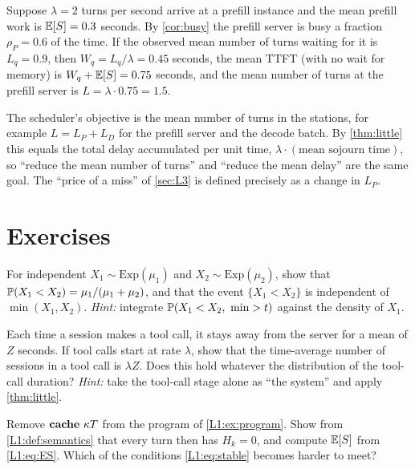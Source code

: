 \begin{example}\label{L1:ex:little}
Suppose $\lambda=2$ turns per second arrive at a prefill instance and the mean prefill
work is $\mathbb{E}[S]=0.3$ seconds. By \cref{cor:busy} the prefill server is busy a fraction
$\rho_P=0.6$ of the time. If the observed mean number of turns waiting for it is
$L_q=0.9$, then $W_q=L_q/\lambda=0.45$ seconds, the mean TTFT (with no wait for memory)
is $W_q+\mathbb{E}[S]=0.75$ seconds, and the mean number of turns at the prefill server is
$L=\lambda\cdot0.75=1.5$.
\end{example}

The scheduler's objective is the mean number of turns in the stations, for example
$L=L_P+L_D$ for the prefill server and the decode batch. By \cref{thm:little} this
equals the total delay accumulated per unit time, $\lambda\cdot(\text{mean sojourn
time})$, so ``reduce the mean number of turns'' and ``reduce the mean delay'' are the
same goal. The ``price of a miss'' of \cref{sec:L3} is defined precisely as a change in
$L_P$.

\section{Exercises}

\begin{exercise}\label{L1:exr:race}
For independent $X_1\sim\mathrm{Exp}(\mu_1)$ and $X_2\sim\mathrm{Exp}(\mu_2)$, show that
$\mathbb{P}(X_1<X_2)=\mu_1/(\mu_1+\mu_2)$, and that the event $\{X_1<X_2\}$ is independent
of $\min(X_1,X_2)$.
\emph{Hint:} integrate $\Prob(X_1<X_2,\ \min>t)$ against the density of $X_1$.
\end{exercise}

\begin{exercise}\label{L1:exr:delay}
Each time a session makes a tool call, it stays away from the server for a mean of $Z$
seconds. If tool calls start at rate $\lambda$, show that the time-average number of
sessions in a tool call is $\lambda Z$. Does this hold whatever the distribution of the
tool-call duration?
\emph{Hint:} take the tool-call stage alone as ``the system'' and apply
\cref{thm:little}.
\end{exercise}

\begin{exercise}\label{L1:exr:nocache}
Remove $\mathbf{cache}\ \kappa T$ from the program of \cref{L1:ex:program}. Show from
\cref{L1:def:semantics} that every turn then has $H_k=0$, and compute $\mathbb{E}[S]$ from
\eqref{L1:eq:ES}. Which of the conditions \eqref{L1:eq:stable} becomes harder to meet?
\end{exercise}

